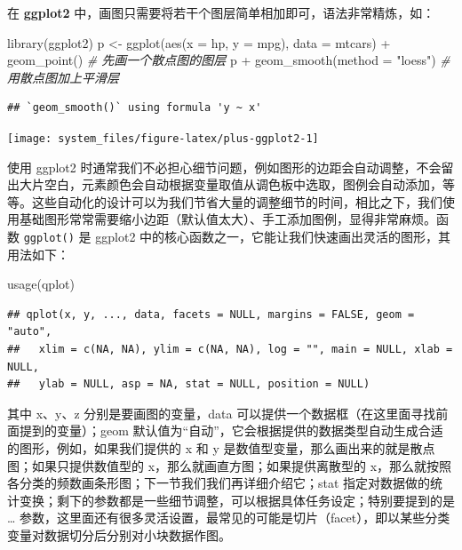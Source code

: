 \documentclass[
  b5paper,
  UTF8,twoside]{book}
\newenvironment{Shaded}{\begin{snugshade}}{\end{snugshade}}
\newcommand{\AttributeTok}[1]{\textcolor[rgb]{0.77,0.63,0.00}{#1}}
\newcommand{\CommentTok}[1]{\textcolor[rgb]{0.56,0.35,0.01}{\textit{#1}}}
\newcommand{\FunctionTok}[1]{\textcolor[rgb]{0.00,0.00,0.00}{#1}}
\newcommand{\NormalTok}[1]{#1}
\newcommand{\OtherTok}[1]{\textcolor[rgb]{0.56,0.35,0.01}{#1}}
\newcommand{\SpecialCharTok}[1]{\textcolor[rgb]{0.00,0.00,0.00}{#1}}
\newcommand{\StringTok}[1]{\textcolor[rgb]{0.31,0.60,0.02}{#1}}
\begin{document}
在 \textbf{ggplot2} 中，画图只需要将若干个图层简单相加即可，语法非常精炼，如：

\begin{Shaded}
\begin{Highlighting}[]
\FunctionTok{library}\NormalTok{(ggplot2)}
\NormalTok{p }\OtherTok{\textless{}{-}} \FunctionTok{ggplot}\NormalTok{(}\FunctionTok{aes}\NormalTok{(}\AttributeTok{x =}\NormalTok{ hp, }\AttributeTok{y =}\NormalTok{ mpg), }\AttributeTok{data =}\NormalTok{ mtcars) }\SpecialCharTok{+}
  \FunctionTok{geom\_point}\NormalTok{() }\CommentTok{\# 先画一个散点图的图层}
\NormalTok{p }\SpecialCharTok{+} \FunctionTok{geom\_smooth}\NormalTok{(}\AttributeTok{method =} \StringTok{"loess"}\NormalTok{) }\CommentTok{\# 用散点图加上平滑层}
\end{Highlighting}
\end{Shaded}

\begin{verbatim}
## `geom_smooth()` using formula 'y ~ x'
\end{verbatim}

\begin{center}\texttt{[image: system\_files/figure-latex/plus-ggplot2-1]} \end{center}

使用 ggplot2 时通常我们不必担心细节问题，例如图形的边距会自动调整，不会留出大片空白，元素颜色会自动根据变量取值从调色板中选取，图例会自动添加，等等。这些自动化的设计可以为我们节省大量的调整细节的时间，相比之下，我们使用基础图形常常需要缩小边距（默认值太大）、手工添加图例，显得非常麻烦。函数 \texttt{ggplot()} 是 ggplot2 中的核心函数之一，它能让我们快速画出灵活的图形，其用法如下：

\begin{Shaded}
\begin{Highlighting}[]
\FunctionTok{usage}\NormalTok{(qplot)}
\end{Highlighting}
\end{Shaded}

\begin{verbatim}
## qplot(x, y, ..., data, facets = NULL, margins = FALSE, geom = "auto",
##   xlim = c(NA, NA), ylim = c(NA, NA), log = "", main = NULL, xlab = NULL,
##   ylab = NULL, asp = NA, stat = NULL, position = NULL)
\end{verbatim}

其中 x、y、z 分别是要画图的变量，data 可以提供一个数据框（在这里面寻找前面提到的变量）；geom 默认值为``自动''，它会根据提供的数据类型自动生成合适的图形，例如，如果我们提供的 x 和 y 是数值型变量，那么画出来的就是散点图；如果只提供数值型的 x，那么就画直方图；如果提供离散型的 x，那么就按照各分类的频数画条形图；下一节我们我们再详细介绍它；stat 指定对数据做的统计变换；剩下的参数都是一些细节调整，可以根据具体任务设定；特别要提到的是 \ldots{} 参数，这里面还有很多灵活设置，最常见的可能是切片（facet），即以某些分类变量对数据切分后分别对小块数据作图。
\end{document}
